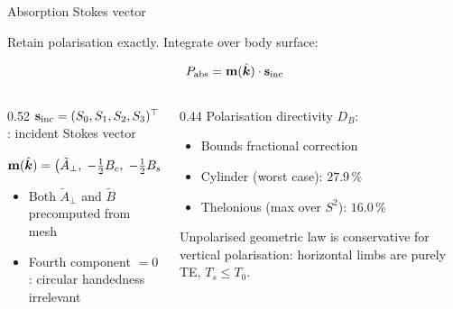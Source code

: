 \begin{frame}{Absorption Stokes vector}
\hypertarget{sum-p2-stokes}{}

  Retain polarisation exactly. Integrate over body surface:

  \begin{resultbox}
    \vspace{-6pt}
    \[
      P_{\mathrm{abs}} = \mathbf{m}(\hat{\bm{k}}) \cdot \mathbf{s}_{\mathrm{inc}}
    \]
  \end{resultbox}

  \vspace{2pt}
  \begin{columns}[T]
    \begin{column}{0.52\textwidth}
      $\mathbf{s}_{\mathrm{inc}} = (S_0, S_1, S_2, S_3)^\top$: incident Stokes vector

      \vspace{4pt}
      $\mathbf{m}(\hat{\bm{k}}) = \bigl(\tilde{A}_\perp,\; -\tfrac{1}{2}B_c,\; -\tfrac{1}{2}B_s,\; 0\bigr)^\top$

      \vspace{4pt}
      \begin{itemize}
        \item Both $\tilde{A}_\perp$ and $\tilde{B}$ precomputed from mesh
        \item Fourth component $= 0$: circular handedness irrelevant
      \end{itemize}
      {\footnotesize {}}
    \end{column}

    \begin{column}{0.44\textwidth}
      Polarisation directivity $D_B$:
      \begin{itemize}
        \item Bounds fractional correction
        \item Cylinder (worst case): $27.9\,\%$
        \item Thelonious (max over $S^2$): $16.0\,\%$
      \end{itemize}

      \vspace{4pt}
      {\footnotesize Unpolarised geometric law is conservative
       for vertical polarisation: horizontal limbs are purely TE,
       $T_s \le T_0$.\\
       \;
       }
    \end{column}
  \end{columns}
\end{frame}

